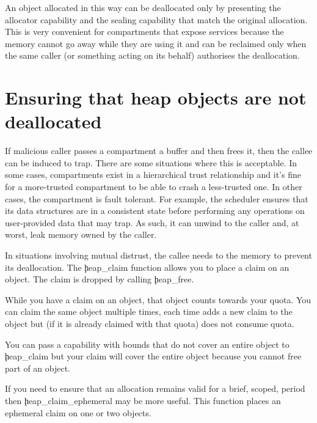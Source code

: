 An object allocated in this way can be deallocated only by presenting  the allocator capability and the sealing capability that match the original allocation.
This is very convenient for compartments that expose services because the memory cannot go away while they are using it and can be reclaimed only when the same caller (or something acting on its behalf) authorises the deallocation.

\section[label=heap_claim]{Ensuring that heap objects are not deallocated}

If malicious caller passes a compartment a buffer and then frees it, then the callee can be induced to trap.
There are some situations where this is acceptable.
In some cases, compartments exist in a hierarchical trust relationship and it's fine for a more-trusted compartment to be able to crash a less-trusted one.
In other cases, the compartment is fault tolerant.
For example, the scheduler ensures that its data structures are in a consistent state before performing any operations on user-provided data that may trap.
As such, it can unwind to the caller and, at worst, leak memory owned by the caller.

In situations involving mutual distrust, the callee needs to  the memory to prevent its deallocation.
The \c{heap_claim} function allows you to place a claim on an object.
The claim is dropped by calling \c{heap_free}.

While you have a claim on an object, that object counts towards your quota.
You can claim the same object multiple times, each time adds a new claim to the object but (if it is already claimed with that quota) does not consume quota.

\begin{note}
You can pass a capability with bounds that do not cover an entire object to \c{heap_claim} but your claim will cover the entire object because you cannot free part of an object.
\end{note}


If you need to ensure that an allocation remains valid for a brief, scoped, period then \c{heap_claim_ephemeral} may be more useful.
This function places an ephemeral claim on one or two objects.


